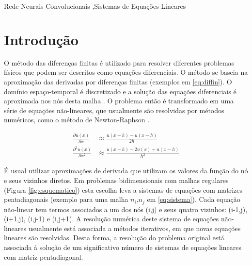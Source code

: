 \documentclass[final,5p]{elsarticle}
\numberwithin{equation}{section}
\begin{document}
\begin{frontmatter}


\begin{keyword}
    Rede Neurais Convolucionais \sep Sistemas de Equações Lineares



\end{keyword}

\end{frontmatter}

\section{Introdução}

     O método das diferenças finitas é utilizado para resolver diferentes problemas físicos que podem ser descritos como equações diferenciais. O método se baseia na aproximação das derivadas por diferenças finitas (exemplos em \ref{eq:diffin}). O domínio espaço-temporal é discretizado e a solução das equações diferenciais é aproximada nos nós desta malha \cite{causon2010introductory}. O problema então é transformado em uma série de equações não-lineares, que usualmente são resolvidas por métodos numéricos, como o método de Newton-Raphson \cite{burden2016analise}.

    \begin{subequations}
        \begin{align}
            \frac{\partial u(x)}{\partial x} &\approx \frac{u(x+h) - u(x-h)}{2h} \\
            \frac{\partial^2 u(x)}{\partial x^2} &\approx \frac{u(x+h) - 2u(x) + u(x-h)}{h^2}
        \end{align}
        \label{eq:diffin}
    \end{subequations}

    É usual utilizar aproximações de derivada que utilizam os valores da função do nó e seus vizinhos diretos. Em problemas bidimensionais com malhas regulares (Figura \ref{fig:esquematico}) esta escolha leva a sistemas de equações com matrizes pentadiagonais (exemplo para uma malha $n_i$,$n_j$ em \ref{eq:sistema}). Cada equação não-linear tem termos associados a um dos nós (i,j) e seus quatro vizinhos: (i-1,j), (i+1,j), (i,j-1) e (i,j+1). A resolução numérica deste sistema de equações não-lineares usualmente está associada a métodos iterativos, em que novas equações lineares são resolvidas. Desta forma, a resolução do problema original está associada à solução de um significativo número de sistemas de equações lineares com matriz pentadiagonal.
\end{document}
